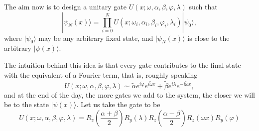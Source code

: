 \documentclass[aps,amssymb,amsmath,amsfonts,pra,superscriptaddress,onecolumn]{revtex4}
\newcommand{\ket}[1]{| #1 \rangle}
\begin{document}
The aim now is to design a unitary gate $U(x; \omega, \alpha, \beta, \varphi, \lambda)$ such that 
\begin{equation}
    \ket{\psi_N(x)} = \prod_{i=0}^N U(x; \omega_i, \alpha_i, \beta_i, \varphi_i, \lambda_i) \ket{\psi_0},
\end{equation}
where $\ket{\psi_0}$ may be any arbitrary fixed state, and $\ket{\psi_N(x)}$ is close to the arbitrary $\ket{\psi(x)}$.

The intuition behind this idea is that every gate contributes to the final state with the equivalent of a  Fourier term, that is, roughly speaking
\begin{equation}
U(x; \omega, \alpha, \beta, \varphi, \lambda) \sim \tilde{\alpha} e^{i\tilde{\varphi}} e^{i\tilde{\omega} x} + \tilde{\beta} e^{i\tilde{\lambda}} e^{-i\tilde{\omega} x},
\end{equation}
and at the end of the day, the more gates we add to the system, the closer we will be to the state $\ket{\psi(x)}$. Let us take the gate to be
\begin{equation}\label{eq:unitary_1}
 U(x; \omega, \alpha, \beta, \varphi, \lambda) = R_z\left(\frac{\alpha + \beta}{2}\right) R_y(\lambda)R_z\left(\frac{\alpha - \beta}{2}\right) R_z(\omega x) R_y(\varphi)
\end{equation}
\end{document}
